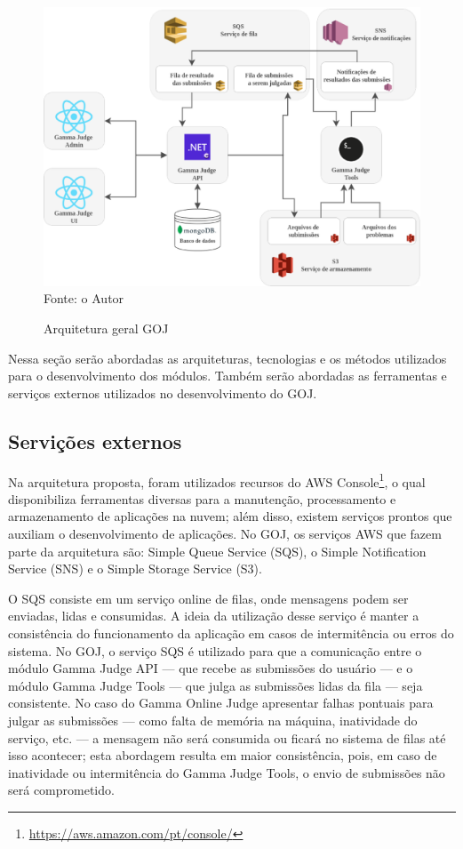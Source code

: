 \begin{figure}
    \centering
    \caption{Arquitetura geral GOJ}
    \includegraphics[keepaspectratio=true,scale=0.45]{figuras/arquitetura_goj.eps}
    \label{fig:arquitetura_goj}
    \medskip
    Fonte: o Autor
    \medskip
\end{figure}

Nessa seção serão abordadas as arquiteturas, tecnologias e os métodos utilizados para o desenvolvimento dos módulos. Também serão abordadas as ferramentas e serviços externos utilizados no desenvolvimento do GOJ.

\subsection{Servições externos} 
\label{subsec:arquitetura_servicos_ext}

Na arquitetura proposta, foram utilizados recursos do AWS Console\footnote{\url{https://aws.amazon.com/pt/console/}}, o qual disponibiliza ferramentas diversas para a manutenção, processamento e armazenamento de aplicações na nuvem; além disso, existem serviços prontos que auxiliam o desenvolvimento de aplicações. No GOJ, os serviços AWS que fazem parte da arquitetura são: Simple Queue Service (SQS), o Simple Notification Service (SNS) e o Simple Storage Service (S3).

O SQS consiste em um serviço online de filas, onde mensagens podem ser enviadas, lidas e consumidas. A ideia da utilização desse serviço é manter a consistência do funcionamento da aplicação em casos de intermitência ou erros do sistema. No GOJ, o serviço SQS é utilizado para que a comunicação entre o módulo Gamma Judge API — que recebe as submissões do usuário — e o módulo Gamma Judge Tools — que julga as submissões lidas da fila — seja consistente. No caso do Gamma Online Judge apresentar falhas pontuais para julgar as submissões — como falta de memória na máquina, inatividade do serviço, etc. — a mensagem não será consumida ou ficará no sistema de filas até isso acontecer; esta abordagem resulta em maior consistência, pois, em caso de inatividade ou intermitência do Gamma Judge Tools, o envio de submissões não será comprometido.

